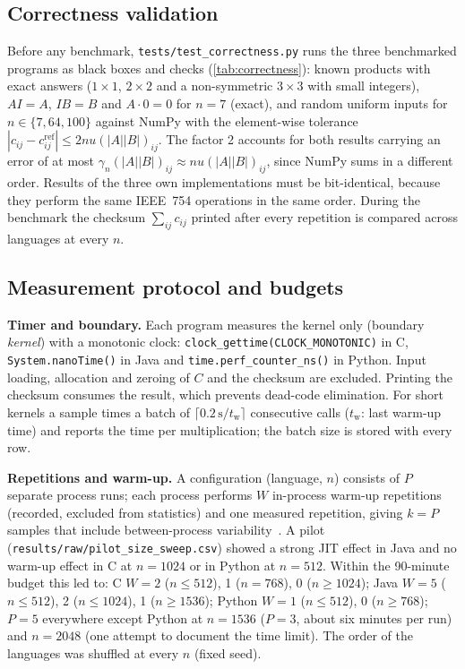 \documentclass[conference,a4paper]{IEEEtran}
\begin{document}
\subsection{Correctness validation}
Before any benchmark, \texttt{tests/test\_correctness.py} runs the three benchmarked programs as black boxes and
checks (\cref{tab:correctness}): known products with exact answers ($1\times1$, $2\times2$ and a non-symmetric
$3\times3$ with small integers), $AI=A$, $IB=B$ and $A\cdot0=0$ for $n=7$ (exact), and random uniform inputs for
$n\in\{7,64,100\}$ against NumPy with the element-wise tolerance $|c_{ij}-c^{\mathrm{ref}}_{ij}|\le 2nu(|A||B|)_{ij}$.
The factor 2 accounts for both results carrying an error of at most $\gamma_n(|A||B|)_{ij}\approx nu(|A||B|)_{ij}$,
since NumPy sums in a different order. Results of the three own implementations must be bit-identical, because they
perform the same IEEE~754 operations in the same order. During the benchmark the checksum $\sum_{ij}c_{ij}$ printed
after every repetition is compared across languages at every $n$.

\subsection{Measurement protocol and budgets}
\label{sec:protocol}
\textbf{Timer and boundary.} Each program measures the kernel only (boundary \emph{kernel}) with a monotonic clock:
\texttt{clock\_gettime(CLOCK\_MONOTONIC)} in C, \texttt{System.nanoTime()} in Java and
\texttt{time.perf\_counter\_ns()} in Python. Input loading, allocation and zeroing of $C$ and the checksum are
excluded. Printing the checksum consumes the result, which prevents dead-code elimination. For short kernels a
sample times a batch of $\lceil 0.2\,\mathrm{s}/t_{\mathrm{w}}\rceil$ consecutive calls ($t_{\mathrm{w}}$: last
warm-up time) and reports the time per multiplication; the batch size is stored with every row.

\textbf{Repetitions and warm-up.} A configuration (language, $n$) consists of $P$ separate process runs; each
process performs $W$ in-process warm-up repetitions (recorded, excluded from statistics) and one measured
repetition, giving $k=P$ samples that include between-process variability~\cite{georges2007}. A pilot
(\texttt{results/raw/pilot\_size\_sweep.csv}) showed a strong JIT effect in Java and no warm-up effect in C at
$n=1024$ or in Python at $n=512$. Within the 90-minute budget this led to: C $W=2$ ($n\le512$), 1 ($n=768$), 0
($n\ge1024$); Java $W=5$ ($n\le512$), 2 ($n\le1024$), 1 ($n\ge1536$); Python $W=1$ ($n\le512$), 0 ($n\ge768$);
$P=5$ everywhere except Python at $n=1536$ ($P=3$, about six minutes per run) and $n=2048$ (one attempt to
document the time limit). The order of the languages was shuffled at every $n$ (fixed seed).
\end{document}
